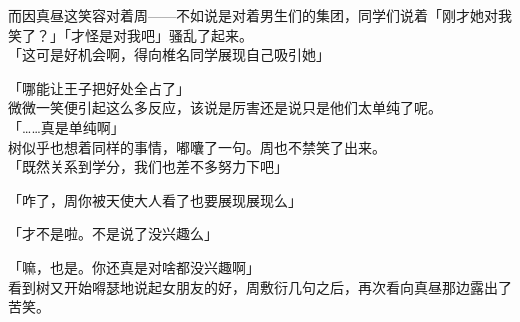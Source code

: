 而因真昼这笑容对着周——不如说是对着男生们的集团，同学们说着「刚才她对我笑了？」「才怪是对我吧」骚乱了起来。\\

「这可是好机会啊，得向椎名同学展现自己吸引她」

「哪能让王子把好处全占了」\\

微微一笑便引起这么多反应，该说是厉害还是说只是他们太单纯了呢。\\

「……真是单纯啊」\\

树似乎也想着同样的事情，嘟囔了一句。周也不禁笑了出来。\\

「既然关系到学分，我们也差不多努力下吧」

「咋了，周你被天使大人看了也要展现展现么」

「才不是啦。不是说了没兴趣么」

「嘛，也是。你还真是对啥都没兴趣啊」\\

看到树又开始嘚瑟地说起女朋友的好，周敷衍几句之后，再次看向真昼那边露出了苦笑。
